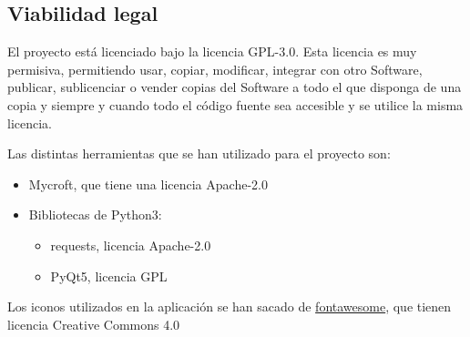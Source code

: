 \subsection{Viabilidad legal}

El proyecto está licenciado bajo la licencia GPL-3.0. Esta licencia es muy permisiva, permitiendo usar, copiar, modificar, integrar con otro Software, publicar, sublicenciar o vender copias del Software a todo el que disponga de una copia y siempre y cuando todo el código fuente sea accesible y se utilice la misma licencia.

Las distintas herramientas que se han utilizado para el proyecto son:
\begin{itemize}
	\item Mycroft, que tiene una licencia Apache-2.0\cite{penrodHavingRightLicense2017}
	\item Bibliotecas de Python3:
	\begin{itemize}
		\item requests\cite{RequestsSoftware2020}, licencia Apache-2.0
		\item PyQt5\cite{RiverbankComputingLicense}, licencia GPL
	\end{itemize}
\end{itemize}

Los iconos utilizados en la aplicación se han sacado de \href{https://fontawesome.com/icons?d=gallery}{fontawesome}, que tienen licencia Creative Commons 4.0\cite{FontAwesome}
